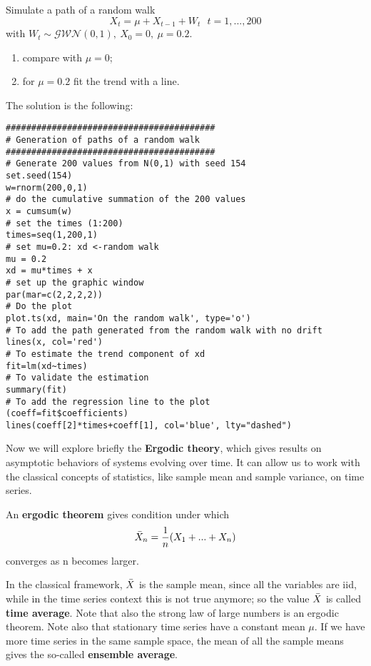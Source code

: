 \begin{example}
    Simulate a path of a random walk
    \[
        X_t=\mu+X_{t-1}+W_t\ \ \ t=1,...,200  
    \]
    with $W_t\sim\mathcal{GWN}(0,1),\ X_0=0,\ \mu=0.2$.
    \begin{enumerate}
        \item compare with $\mu=0$;
        \item for $\mu=0.2$ fit the trend with a line.
    \end{enumerate}
    
    The solution is the following:
    \begin{verbatim}
#########################################
# Generation of paths of a random walk
#########################################
# Generate 200 values from N(0,1) with seed 154
set.seed(154)
w=rnorm(200,0,1)
# do the cumulative summation of the 200 values
x = cumsum(w)
# set the times (1:200)
times=seq(1,200,1)
# set mu=0.2: xd <-random walk
mu = 0.2
xd = mu*times + x
# set up the graphic window
par(mar=c(2,2,2,2))
# Do the plot
plot.ts(xd, main='On the random walk', type='o')
# To add the path generated from the random walk with no drift
lines(x, col='red')
# To estimate the trend component of xd
fit=lm(xd~times)
# To validate the estimation
summary(fit)
# To add the regression line to the plot
(coeff=fit$coefficients)
lines(coeff[2]*times+coeff[1], col='blue', lty="dashed")        
    \end{verbatim}
\end{example}

Now we will explore briefly the \textbf{Ergodic theory}, which gives results on asymptotic behaviors of systems evolving over time. It can allow us to work with the classical concepts of statistics, like sample mean and sample variance, on time series.

\begin{definition}
    An \textbf{ergodic theorem} gives condition under which
    \[
        \bar{X}_n=\frac{1}{n}(X_1+...+X_n)
    \]
    converges as n becomes larger.
\end{definition}
In the classical framework, $\bar{X}$ is the sample mean, since all the variables are iid, while in the time series context this is not true anymore; so the value $\bar{X}$ is called \textbf{time average}. Note that also the strong law of large numbers is an ergodic theorem. Note also that stationary time series have a constant mean $\mu$. If we have more time series in the same sample space, the mean of all the sample means gives the so-called \textbf{ensemble average}.

